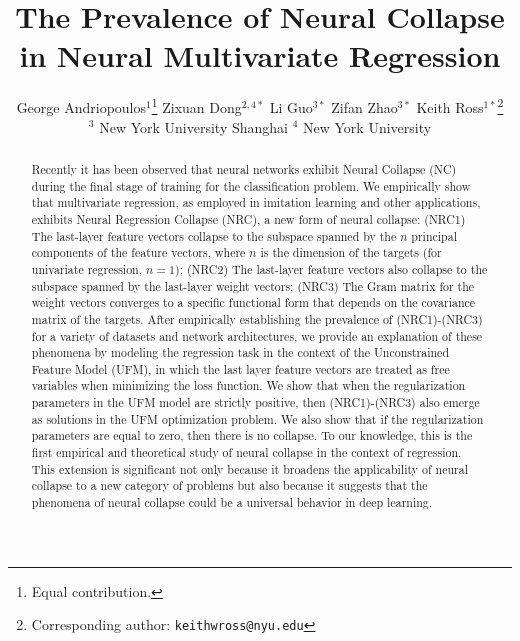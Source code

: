 \documentclass{article}
\title{The Prevalence of Neural Collapse \\in Neural Multivariate  Regression}
\author{%
  George Andriopoulos$^{1}$\thanks{Equal contribution.} \quad Zixuan Dong$^{2,4*}$ \quad Li Guo$^{3*}$ \quad Zifan Zhao$^{3*}$ \quad Keith Ross$^{1*}$\thanks{Corresponding author: \texttt{keithwross@nyu.edu}}\AND
  \text{\normalfont $^1$ New York University Abu Dhabi \quad
  $^2$ SFSC of AI and DL, NYU Shanghai}\\
$^3$ New York University Shanghai \quad
$^4$ New York University\\
}
\theoremstyle{plain}
\theoremstyle{definition}
\theoremstyle{remark}
\begin{document}
\maketitle


\begin{abstract}
Recently it has been observed that neural networks exhibit Neural Collapse (NC) during the final stage of training for the classification problem. We empirically show that multivariate regression, as employed in imitation learning and other applications, exhibits Neural Regression Collapse (NRC), a new form of neural collapse: (NRC1) The last-layer feature vectors collapse to the subspace spanned by the $n$ principal components of the feature vectors, where $n$ is the dimension of the targets (for univariate regression, $n=1$); (NRC2) The last-layer feature vectors also collapse to the subspace spanned by the last-layer weight vectors; (NRC3) The Gram matrix for the weight vectors converges to a specific functional form that depends on the covariance matrix of the targets. After empirically establishing the prevalence of (NRC1)-(NRC3) for a variety of datasets and network architectures, we provide an explanation of these phenomena by modeling the regression task in the context of the  Unconstrained Feature Model (UFM), in which the last layer feature vectors are treated as free variables when minimizing the loss function. We show that when the regularization parameters in the UFM model are strictly positive, then (NRC1)-(NRC3) also emerge as solutions in the UFM optimization problem. We also show that if the regularization parameters are equal to zero, then there is no collapse. To our knowledge, this is the first empirical and theoretical study of neural collapse in the context of regression. This extension is significant not only because it broadens the applicability of neural collapse to a new category of problems but also because it suggests that the phenomena of neural collapse could be a universal behavior in deep learning.
\end{abstract}
\end{document}
